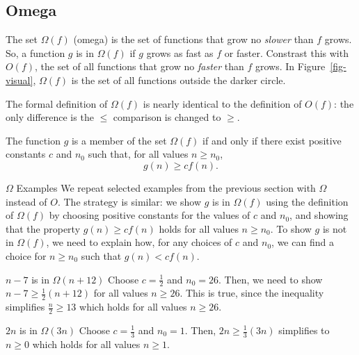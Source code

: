 \begin{schemeregion}
\subsection{Omega}

The set $\Omega(f)$ (omega) is the set of functions that grow no \emph{slower} than $f$ grows.  So, a function $g$ is in $\Omega(f)$ if $g$ grows as fast as $f$ or faster.   
Constrast this with $O(f)$, the set of all functions that grow no \emph{faster} than $f$ grows. In Figure~\ref{fig-visual}, $\Omega(f)$ is the set of all functions outside the darker circle.

The formal definition of $\Omega(f)$ is nearly identical to the definition of $O(f)$: the only difference is the $\le$ comparison is changed to $\ge$.  

 The function $g$ is a member of the set $\Omega(f)$ if and only if there exist positive constants $c$ and $n_0$ such that, for all values $n \ge n_0$,
\begin{displaymath}
g(n) \ge cf(n).
\end{displaymath} 

\begin{example}{$\Omega$ Examples}
We repeat selected examples from the previous section with $\Omega$ instead of $O$.  The strategy is similar: we show $g$ is in $\Omega(f)$ using the definition of $\Omega(f)$ by choosing positive constants for the values of $c$ and $n_0$, and showing that the property $g(n) \ge cf(n)$ holds for all values $n \ge n_0$.  To show $g$ is not in $\Omega(f)$, we need to explain how, for any choices of $c$ and $n_0$, we can find a choice for $n \ge n_0$ such that $g(n) < cf(n)$.  

\begin{descriptionlist}
\item[$n-7$ is in $\Omega(n+12)$]\forcenl Choose $c = \frac{1}{2}$ and $n_0 = 26$.  Then, we need to show $n-7 \ge \frac{1}{2} (n+12)$ for all values $n \ge 26$.  This is true, since the inequality simplifies $\frac{n}{2} \ge 13$ which holds for all values $n \ge 26$.  %

\item[$2n$ is in $\Omega(3n)$]\forcenl Choose $c = \frac{1}{3}$ and $n_0 = 1$.  Then, $2n \ge \frac{1}{3}(3n)$ simplifies to $n \ge 0$ which holds for all values $n \ge 1$.


\end{descriptionlist}
\end{example}
\end{schemeregion}
